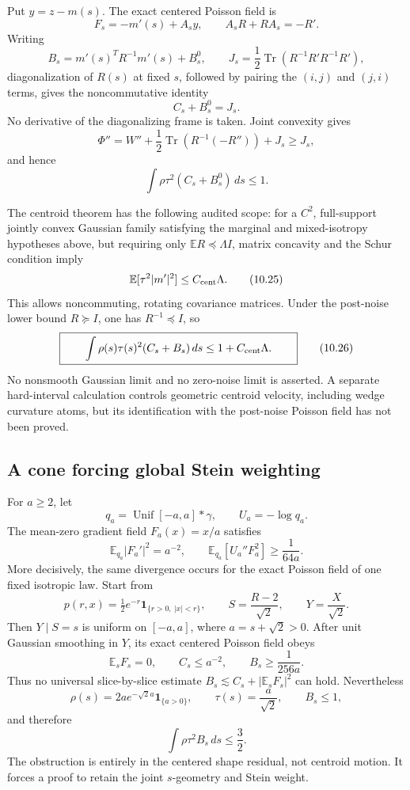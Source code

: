 \documentclass[11pt]{article}
\theoremstyle{definition}
\theoremstyle{remark}
\newcommand{\E}{\mathbb E}
\newcommand{\Tr}{\operatorname{Tr}}
\newcommand{\1}{\mathbf 1}
\begin{document}
Put \(y=z-m(s)\).  The exact centered Poisson field is
\[
 F_s=-m'(s)+A_sy,\qquad A_sR+RA_s=-R'.
\]
Writing
\[
 B_s=m'(s)^TR^{-1}m'(s)+B_s^0,\qquad
 J_s=\frac12\Tr(R^{-1}R'R^{-1}R'),
\]
diagonalization of \(R(s)\) at fixed \(s\), followed by pairing the
\((i,j)\) and \((j,i)\) terms, gives the noncommutative identity
\[
                         \boxed{C_s+B_s^0=J_s}.       \tag{10.22}
\]
No derivative of the diagonalizing frame is taken.  Joint convexity gives
\[
 \Phi''
 =W''+\frac12\Tr(R^{-1}(-R''))+J_s\ge J_s,           \tag{10.23}
\]
and hence
\[
                         \int\rho\tau^2(C_s+B_s^0)\,ds\le1. \tag{10.24}
\]

The centroid theorem has the following audited scope: for a \(C^2\),
full-support jointly convex Gaussian family satisfying the marginal and
mixed-isotropy hypotheses above, but requiring only
\(\E R\preceq\Lambda I\), matrix concavity and the Schur condition imply
\[
                         \E[\tau^2|m'|^2]\le C_{\rm cent}\Lambda. \tag{10.25}
\]
This allows noncommuting, rotating covariance matrices.  Under the
post-noise lower bound \(R\succeq I\), one has \(R^{-1}\preceq I\), so
\[
 \boxed{\qquad
 \int\rho(s)\tau(s)^2(C_s+B_s)\,ds
 \le1+C_{\rm cent}\Lambda.
 \qquad}                                              \tag{10.26}
\]
No nonsmooth Gaussian limit and no zero-noise limit is asserted.  A
separate hard-interval calculation controls geometric centroid velocity,
including wedge curvature atoms, but its identification with the
post-noise Poisson field has not been proved.

\subsection{A cone forcing global Stein weighting}

For \(a\ge2\), let
\[
 q_a=\operatorname{Unif}[-a,a]*\gamma,\qquad U_a=-\log q_a.
\]
The mean-zero gradient field \(F_a(x)=x/a\) satisfies
\[
 \E_{q_a}|F_a'|^2=a^{-2},\qquad
 \E_{q_a}[U_a''F_a^2]\ge\frac1{64a}.                 \tag{10.27}
\]
More decisively, the same divergence occurs for the exact Poisson field
of one fixed isotropic law.  Start from
\[
 p(r,x)=\tfrac12e^{-r}\1_{\{r>0,\ |x|<r\}},\qquad
 S=\frac{R-2}{\sqrt2},\qquad Y=\frac X{\sqrt2}.
\]
Then \(Y\mid S=s\) is uniform on \([-a,a]\), where
\(a=s+\sqrt2>0\).  After unit Gaussian smoothing in \(Y\), its exact
centered Poisson field obeys
\[
 \E_sF_s=0,\qquad C_s\le a^{-2},\qquad
 B_s\ge\frac1{256a}.                                 \tag{10.28}
\]
Thus no universal slice-by-slice estimate
\(B_s\lesssim C_s+|\E_sF_s|^2\) can hold.  Nevertheless
\[
 \rho(s)=2ae^{-\sqrt2a}\1_{\{a>0\}},\qquad
 \tau(s)=\frac a{\sqrt2},\qquad B_s\le1,
\]
and therefore
\[
                         \int\rho\tau^2B_s\,ds\le\frac32. \tag{10.29}
\]
The obstruction is entirely in the centered shape residual, not centroid
motion.  It forces a proof to retain the joint \(s\)-geometry and Stein
weight.
\end{document}
